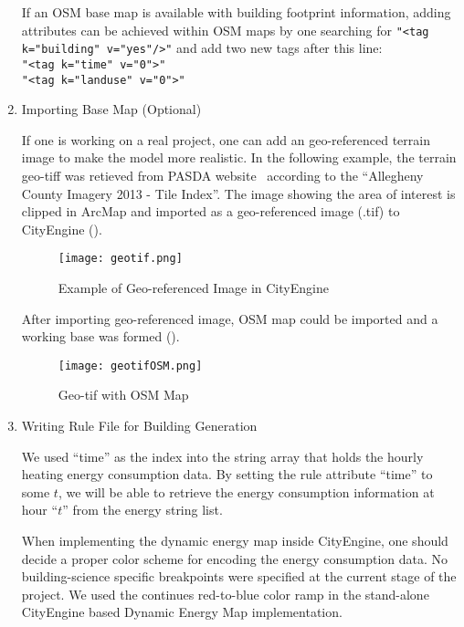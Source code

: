 \begin{enumerate}[1)]
  If an OSM base map is available with building footprint information,
  adding attributes can be achieved within OSM maps by one searching
  for \texttt{"<tag k="building" v="yes"/>"} and add two new tags
  after this
  line:\\
  \texttt{"<tag k="time" v="0"\/>"}\\
  \texttt{"<tag k="landuse" v="0"\/>"}\\

\item{Importing Base Map (Optional)}

  If one is working on a real project, one can add an geo-referenced
  terrain image to make the model more realistic. In the following
  example, the terrain geo-tiff was retieved from PASDA
  website~\cite{PASDAImagery2013} according to the ``Allegheny County
  Imagery 2013 - Tile Index''. The image showing the area of interest
  is clipped in ArcMap and imported as a geo-referenced image (.tif)
  to CityEngine ().

  \begin{figure}[h!]
    \centering
    \texttt{[image: geotif.png]}
    \caption[Geo-tif in CityEngine]{Example of Geo-referenced Image in
      CityEngine}
    \label{fig:geotif}
  \end{figure}

  After importing geo-referenced image, OSM map could be imported and
  a working base was formed ().
  \begin{figure}[h!]
    \centering
    \texttt{[image: geotifOSM.png]}
    \caption[Geo-tif with OSM Map]{Geo-tif with OSM Map}
    \label{fig:geotifOSM}
  \end{figure}

\item{Writing Rule File for Building Generation}

  We used ``time'' as the index into the string array that holds the
  hourly heating energy consumption data. By setting the rule
  attribute ``time'' to some $t$, we will be able to retrieve the
  energy consumption information at hour ``$t$'' from the energy
  string list.

  When implementing the dynamic energy map inside CityEngine, one
  should decide a proper color scheme for encoding the energy
  consumption data. No building-science specific breakpoints were
  specified at the current stage of the project. We used the continues
  red-to-blue color ramp in the stand-alone CityEngine based Dynamic
  Energy Map implementation.


\end{enumerate}

